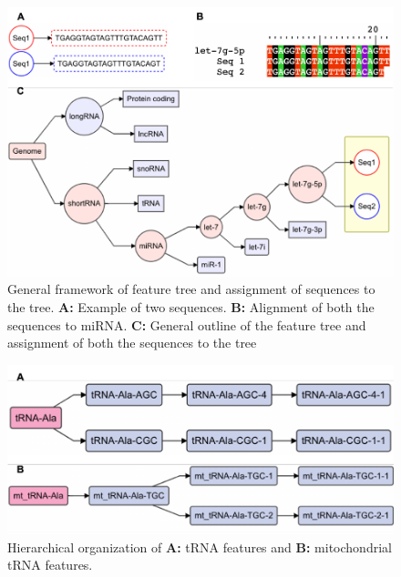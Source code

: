 \documentclass[12pt,twoside]{reedthesis}
\begin{document}
\begin{figure}[htbp]

{\centering \includegraphics{thesis_files/figure-latex/3f8-1} 

}

\caption{General framework of feature tree and assignment of sequences to the tree. \textbf{A:} Example of two sequences. \textbf{B:} Alignment of both the sequences to miRNA. \textbf{C:} General outline of the feature tree and assignment of both the sequences to the tree}\label{fig:3f8}
\end{figure}

\begin{figure}[htbp]

{\centering \includegraphics{thesis_files/figure-latex/3f9-1} 

}

\caption{Hierarchical organization of \textbf{A:} tRNA features and \textbf{B:} mitochondrial tRNA features.}\label{fig:3f9}
\end{figure}
\end{document}
